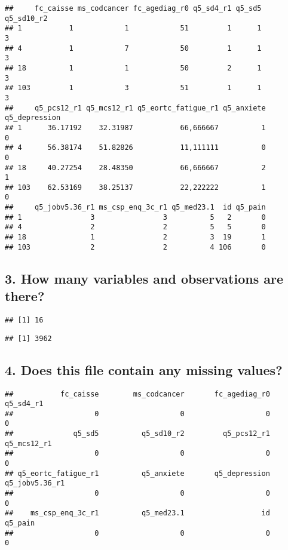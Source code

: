 \documentclass[
]{article}
\begin{document}
\begin{verbatim}
##     fc_caisse ms_codcancer fc_agediag_r0 q5_sd4_r1 q5_sd5 q5_sd10_r2
## 1           1            1            51         1      1          3
## 4           1            7            50         1      1          3
## 18          1            1            50         2      1          3
## 103         1            3            51         1      1          3
##     q5_pcs12_r1 q5_mcs12_r1 q5_eortc_fatigue_r1 q5_anxiete q5_depression
## 1      36.17192    32.31987           66,666667          1             0
## 4      56.38174    51.82826           11,111111          0             0
## 18     40.27254    28.48350           66,666667          2             1
## 103    62.53169    38.25137           22,222222          1             0
##     q5_jobv5.36_r1 ms_csp_enq_3c_r1 q5_med23.1  id q5_pain
## 1                3                3          5   2       0
## 4                2                2          5   5       0
## 18               1                2          3  19       1
## 103              2                2          4 106       0
\end{verbatim}

\hypertarget{how-many-variables-and-observations-are-there}{%
\subsection{3. How many variables and observations are
there?}\label{how-many-variables-and-observations-are-there}}

\begin{verbatim}
## [1] 16
\end{verbatim}

\begin{verbatim}
## [1] 3962
\end{verbatim}

\hypertarget{does-this-file-contain-any-missing-values}{%
\subsection{4. Does this file contain any missing
values?}\label{does-this-file-contain-any-missing-values}}

\begin{verbatim}
##           fc_caisse        ms_codcancer       fc_agediag_r0           q5_sd4_r1 
##                   0                   0                   0                   0 
##              q5_sd5          q5_sd10_r2         q5_pcs12_r1         q5_mcs12_r1 
##                   0                   0                   0                   0 
## q5_eortc_fatigue_r1          q5_anxiete       q5_depression      q5_jobv5.36_r1 
##                   0                   0                   0                   0 
##    ms_csp_enq_3c_r1          q5_med23.1                  id             q5_pain 
##                   0                   0                   0                   0
\end{verbatim}
\end{document}
